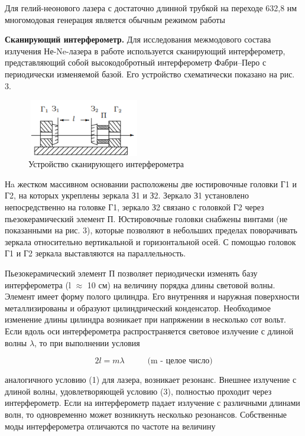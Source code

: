 \documentclass[12pt,a4paper]{article}
\begin{document}
\par Для гелий-неонового лазера с достаточно длинной трубкой на переходе 632,8 нм многомодовая генерация является обычным режимом работы

\par \textbf{Сканирующий интерферометр.} Для исследования межмодового состава излучения Не-Ne-лазера в работе используется сканирующий интерферометр, представляющий собой высокодобротный интерферометр Фабри–Перо с периодически изменяемой базой. Его
устройство схематически показано на рис. 3. 

\begin{figure}
	\vspace{-4ex}
	\includegraphics[width=5cm, height=2.5cm]{4.5.3-4}
	\caption{Устройство сканирующего интерферометра}
\end{figure}	 

\par Нa жестком массивном основании расположены две юстировочные головки Г1 и Г2, на которых укреплены зеркала З1 и З2. Зеркало
З1 установлено непосредственно на головке Г1, зеркало З2 связано с головкой Г2 через пьезокерамический элемент П. Юстировочные головки снабжены винтами (не показанными на рис. 3), которые
позволяют в небольших пределах поворачивать зеркала относительно вертикальной и горизонтальной осей. С помощью головок Г1 и Г2 зеркала выставляются на параллельность.

\par Пьезокерамический элемент П позволяет периодически изменять
базу интерферометра (l $\approx$ 10 см) на величину порядка длины световой волны. Элемент имеет форму полого цилиндра. Его внутренняя и наружная поверхности металлизированы и образуют цилиндрический конденсатор. Необходимое изменение длины цилиндра возникает при напряжении в несколько сот вольт. Если вдоль оси интерферометра распространяется световое излучение с длиной волны
$\lambda$, то при выполнении условия

\begin{equation}
2l = m\lambda \;\;\;\;\;\;\;\;\;\; \text{(m - целое число)}
\end{equation}

аналогичного условию (1) для лазера, возникает резонанс. Внешнее
излучение с длиной волны, удовлетворяющей условию (3), полностью
проходит через интерферометр. Если на интерферометр падает излучение с различными длинами волн, то одновременно может возникнуть несколько резонансов. Собственные моды интерферометра отличаются по частоте на величину
\end{document}
